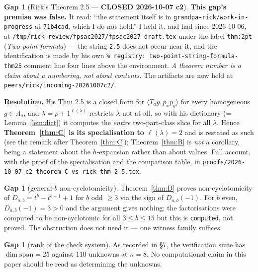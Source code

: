 \documentclass[11pt]{article}
\theoremstyle{plain}
\theoremstyle{definition}
\newtheorem{gap}[theorem]{Gap}
\newcommand{\lam}{\lambda}
\begin{document}
\begin{gap}[Rick's Theorem 2.5 --- \textbf{CLOSED 2026-10-07 c2}]\label{gap:rick}
\textbf{This gap's premise was false.} It read: ``the statement itself is in
\texttt{grandpa-rick/work-in-progress} at \texttt{71b4cad}, which I do not hold.'' I held it, and
had since 2026-10-06, at \texttt{/tmp/rick-review/fpsac2027/fpsac2027-draft.tex} under the label
\texttt{thm:2pt} (\emph{Two-point formula}) --- the string \texttt{2.5} does not occur near it, and
the identification is made by his own \texttt{\% registry: two-point-string-formula-thm25} comment
line four lines above the environment. \emph{A theorem number is a claim about a numbering, not
about contents.} The artifacts are now held at \texttt{peers/rick/incoming-20261007c2/}.

\textbf{Resolution.} His Thm 2.5 is a closed form for $\langle T_ag,p_xp_y\rangle$ for every
homogeneous $g\in\Lambda_a$, and $\lam=\rho+1^{\ell(\lam)}$ restricts $\lam$ not at all, so with
his dictionary (= Lemma~\ref{lem:dict}) it computes the \emph{entire} two-part-class slice for all
$\lam$. Hence \textbf{Theorem~\ref{thm:C} is its specialisation to $\ell(\lam)=2$} and is restated
as such (see the remark after Theorem~\ref{thm:C}); Theorem~\ref{thm:B} is \emph{not} a corollary,
being a statement about the $h$-expansion rather than about values. Full account, with the proof of
the specialisation and the comparison table, in
\texttt{proofs/2026-10-07-c2-theorem-C-vs-rick-thm-2-5.tex}.
\end{gap}

\begin{gap}[general-$b$ non-cyclotomicity]\label{gap:evenb}
Theorem~\ref{thm:D} proves non-cyclotomicity of $D_{a,b}=t^b-t^{b-1}+1$ for $b$ odd $\ge 3$ via
the sign of $D_{a,b}(-1)$. For $b$ even, $D_{a,b}(-1)=3>0$ and the argument gives nothing; the
factorisations were computed to be non-cyclotomic for all $3\le b\le 15$ but this is
\texttt{computed}, not proved. The obstruction does not need it --- one witness family suffices.
\end{gap}

\begin{gap}[rank of the check system]\label{gap:rank}
As recorded in \S7, the verification suite has $\dim\text{span}=25$ against $110$ unknowns at
$n=8$. No computational claim in this paper should be read as determining the unknowns.
\end{gap}
\end{document}

